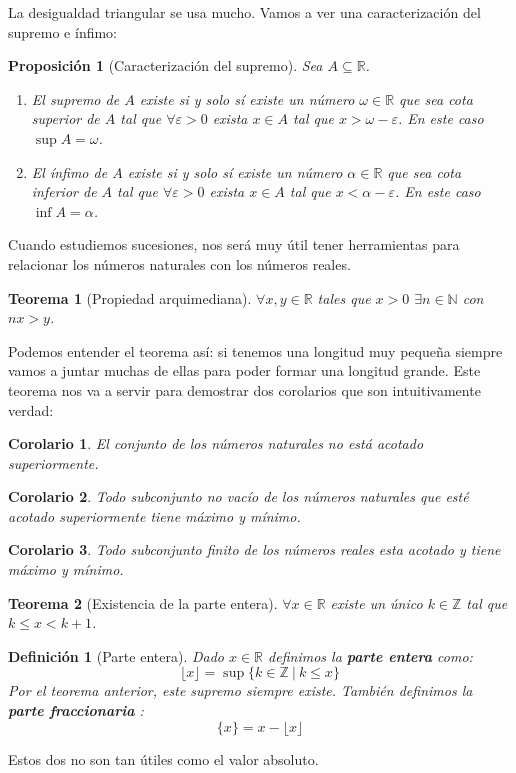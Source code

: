 \documentclass{article}
\newtheorem{theorem}{Teorema}
\newtheorem{prop}{Proposición}
\newtheorem{cor}{Corolario}
\newtheorem{define}{Definición}
\begin{document}
La desigualdad triangular se usa mucho. Vamos a ver una caracterización del supremo e ínfimo:
\begin{prop}[Caracterización del supremo]
Sea $A\subseteq \mathbb{R}$.
\begin{enumerate}
\item
El supremo de $A$ existe si y solo sí existe un número $\omega \in \mathbb{R}$ que sea cota superior de $A$ tal que $\forall \varepsilon > 0$ exista $x \in A$ tal que $x > \omega - \varepsilon$. En este caso $\sup A = \omega$.

\item
El ínfimo de $A$ existe si y solo sí existe un número $\alpha \in \mathbb{R}$ que sea cota inferior de $A$ tal que $\forall \varepsilon > 0$ exista $x \in A$ tal que $x < \alpha - \varepsilon$. En este caso $\inf A = \alpha$.
\end{enumerate}
\end{prop}


Cuando estudiemos sucesiones, nos será muy útil tener herramientas para relacionar los números naturales con los números reales.


\begin{theorem}[Propiedad arquimediana]
$\forall x,y \in \mathbb{R}$ tales que $x>0$ $\exists n \in \mathbb{N}$ con $nx>y$.
\end{theorem}
Podemos entender el teorema así: si tenemos una longitud muy pequeña siempre vamos a juntar muchas de ellas para poder formar una longitud grande. Este teorema nos va a servir para demostrar dos corolarios que son intuitivamente verdad:
\begin{cor}
	El conjunto de los números naturales no está acotado superiormente.
\end{cor}
\begin{cor}
	Todo subconjunto no vacío de los números naturales que esté acotado superiormente tiene máximo y mínimo.
\end{cor}
\begin{cor}
	Todo subconjunto finito de los números reales esta acotado y tiene máximo y mínimo.
\end{cor}

\begin{theorem}[Existencia de la parte entera]
$\forall x \in \mathbb{R}$ existe un único $k \in \mathbb{Z}$ tal que $k\leq x < k+1$.
\end{theorem}
\begin{define}[Parte entera]
Dado $x \in \mathbb{R}$ definimos la \textbf{parte entera} como:
\begin{equation}
\lfloor x \rfloor = \sup \{k\in \mathbb{Z}\ |\ k\leq x\}
\end{equation}
Por el teorema anterior, este supremo siempre existe. También definimos la \textbf{parte fraccionaria} :
\begin{equation}
\{x\} = x - \lfloor x \rfloor
\end{equation}
\end{define}
Estos dos no son tan útiles como el valor absoluto.
\end{document}

